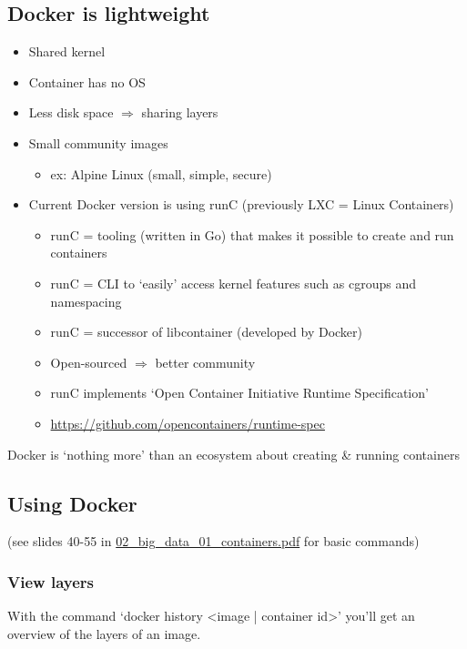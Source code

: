 \documentclass{article}
\begin{document}
\subsection{Docker is lightweight}

\begin{itemize}
    \item Shared kernel
    \item Container has no OS
    \item Less disk space $\Rightarrow$ sharing layers
    \item Small community images
    \begin{itemize}
        \item ex: Alpine Linux (small, simple, secure)
    \end{itemize}
    \item Current Docker version is using runC (previously LXC = Linux Containers)
    \begin{itemize}
        \item runC = tooling (written in Go) that makes it possible to create and run containers
        \item runC = CLI to `easily' access kernel features such as cgroups and namespacing
        \item runC = successor of libcontainer (developed by Docker)
        \item Open-sourced $\Rightarrow$ better community
        \item runC implements `Open Container Initiative Runtime Specification'
        \item \url{https://github.com/opencontainers/runtime-spec}
    \end{itemize}
\end{itemize}

Docker is `nothing more' than an ecosystem about creating \& running containers

\subsection{Using Docker}

(see slides 40-55 in \underline{02\_big\_data\_01\_containers.pdf} for basic commands)

\subsubsection{View layers}

With the command `docker history <image | container id>' you'll get an overview of the layers of an image.
\end{document}
